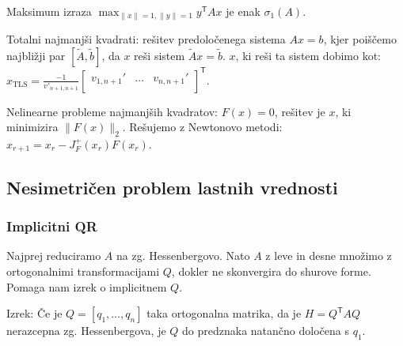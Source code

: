 \documentclass[a4paper,10pt]{article}
\theoremstyle{definition}
\newcommand{\T}{\mathsf{T}\!}
\begin{document}
Maksimum izraza $\displaystyle \max_{\|x\|=1, \|y\|=1} y^\T A x$ je enak $\sigma_1(A)$.

Totalni najmanjši kvadrati:
rešitev predoločenega sistema $Ax = b$, kjer poiščemo najbližji par $[\tilde{A},
\tilde{b}]$, da $x$ reši sistem $\tilde{A}x = \tilde{b}$.
$x$, ki reši ta sistem dobimo kot:
$x_{\text{TLS}} = \frac{-1}{v'_{n+1,n+1}}
  \begin{bmatrix}
    v_{1,n+1}' & \dots & v_{n,n+1}' \\
  \end{bmatrix}^\T$.

Nelinearne probleme najmanjših kvadratov: $F(x) = 0$, rešitev je $x$, ki
minimizira $\|F(x)\|_2$. Rešujemo z Newtonovo metodi:
$x_{r+1} = x_r - J_F^+(x_r)F(x_r)$.

\subsection*{Nesimetričen problem lastnih vrednosti}
\subsubsection*{Implicitni QR}
Najprej reduciramo $A$ na zg. Hessenbergovo. Nato $A$ z leve in desne množimo z
ortogonalnimi transformacijami $Q$, dokler ne skonvergira do shurove forme.
Pomaga nam izrek o implicitnem $Q$.

Izrek: Če je $Q  = [q_1, \dots, q_n]$ taka ortogonalna matrika, da je $H = Q^\T
A Q$ nerazcepna zg. Hessenbergova, je $Q$ do predznaka natančno določena s $q_1$.
\end{document}

